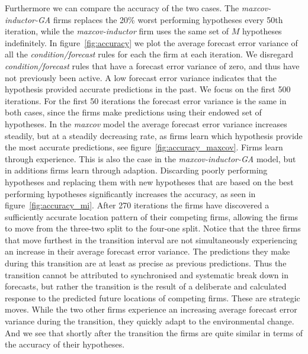 \documentclass[preprint, 12pt]{elsarticle}
\begin{document}
Furthermore we can compare the accuracy of the two cases. The \emph{maxcov-inductor-GA} firms replaces the 20\% worst performing hypotheses every 50th iteration, while the \emph{maxcov-inductor} firm uses the same set of $M$ hypotheses indefinitely. In figure~\ref{fig:accuracy} we plot the average forecast error variance of all the \emph{condition/forecast} rules for each the firm at each iteration. We disregard \emph{condition/forecast} rules that have a forecast error variance of zero, and thus have not previously been active. A low forecast error variance indicates that the hypothesis provided accurate predictions in the past. We focus on the first 500 iterations. For the first 50 iterations the forecast error variance is the same in both cases, since the firms make predictions using their endowed set of hypotheses. In the \emph{maxcov} model the average forecast error variance increases steadily, but at a steadily decreasing rate, as firms learn which hypothesis provide the most accurate predictions, see figure~\ref{fig:accuracy_maxcov}. Firms learn through experience. This is also the case in the \emph{maxcov-inductor-GA} model, but in additions firms learn through adaption. Discarding poorly performing hypotheses and replacing them with new hypotheses that are based on the best performing hypotheses significantly increases the accuracy, as seen in figure~\ref{fig:accuracy_mi}. After 270 iterations the firms have discovered a sufficiently accurate location pattern of their competing firms, allowing the firms to move from the three-two split to the four-one split. Notice that the three firms that move furthest in the transition interval are not simultaneously experiencing an increase in their average forecast error variance. The predictions they make during this transition are at least as precise as previous predictions. Thus the transition cannot be attributed to synchronised and systematic break down in forecasts, but rather the transition is the result of a deliberate and calculated response to the predicted future locations of competing firms. These are strategic moves. While the two other firms experience an increasing average forecast error variance during the transition, they quickly adapt to the environmental change. And we see that shortly after the transition the firms are quite similar in terms of the accuracy of their hypotheses.
\end{document}

